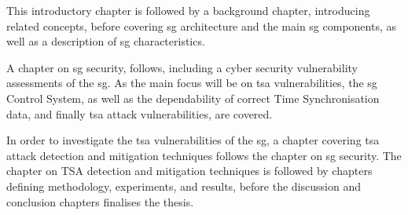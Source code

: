This introductory chapter is followed by a background chapter, introducing related concepts, before covering \acrlong{sg} architecture and the main \acrshort{sg} components, as well as a description of \acrshort{sg} characteristics.

A chapter on \acrlong{sg} security, follows, including a cyber security vulnerability assessments of the \acrshort{sg}. As the main focus will be on \acrshort{tsa} vulnerabilities, the \acrshort{sg} Control System, as well as the dependability of correct Time Synchronisation data, and finally \acrshort{tsa} attack vulnerabilities, are covered. 

In order to investigate the \acrshort{tsa}  vulnerabilities of the \acrlong{sg}, a chapter covering \acrshort{tsa}  attack detection and mitigation techniques follows the chapter on \acrshort{sg} security.
The chapter on TSA detection and mitigation techniques is followed by chapters defining methodology, experiments, and results, before the discussion and conclusion chapters finalises the thesis. 


